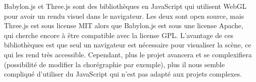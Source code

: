 Babylon.js et Three.js sont des bibliothèques en JavaScript qui utilisent WebGL pour avoir un rendu visuel dans le navigateur. Les deux sont open source, mais Three.js est sous license MIT alors que Babylon.js est sous une license Apache, qui cherche encore à être compatible avec la license GPL. L'avantage de ces bibliothèques est que seul un navigateur est nécessaire pour visualiser la scène, ce qui les rend très accessible. Cependant, plus le projet avancera et se complexifiera (possibilité de modifier la chorégraphie par exemple), plus il nous semble compliqué d'utiliser du JavaScript qui n'est pas adapté aux projets complexes.






